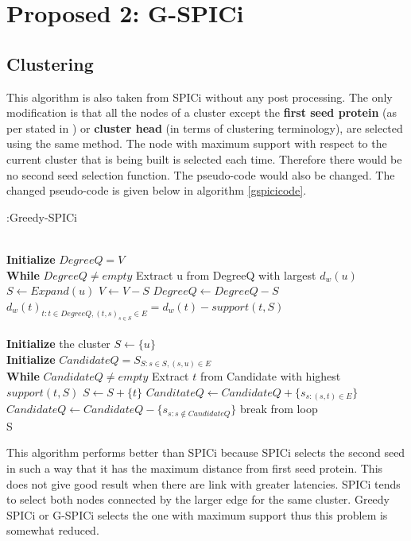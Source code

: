 \documentclass[10pt]{extarticle}
\begin{document}
	\section{Proposed 2: G-SPICi} \label{algo:gspici}
	
	\subsection{Clustering}
	This algorithm is  also taken from SPICi without any post processing. The only modification is that all the nodes of a cluster except the \textbf{first seed protein} (as per stated in \cite{spici}) or \textbf{cluster head} (in terms of clustering terminology), are selected using the same method. The node with maximum support with respect to the current cluster that is being built is selected each time. Therefore there would be no second seed selection function. The pseudo-code would also be changed. The changed pseudo-code is given below in algorithm \ref{gspicicode}.
	\begin{algorithm}
		\caption{:Greedy-SPICi}\label{gspicicode}
		\begin{algorithmic}[1]
			 \\
			\textbf{Initialize} $DegreeQ = V$ \\
			\textbf{While} $DegreeQ \neq empty$
			\State Extract u from DegreeQ with largest $d_w(u)$
			\State $S \gets Expand(u)$
			\State $V \gets V - S $
			\State $Degree Q \gets Degree Q - S$
			\State $d_w(t)_{t:t\in DegreeQ,(t,s)_{s\in S}\in E} = d_w(t) - support(t,S)$
			\EndProcedure\\
			\\
			\textbf{Initialize} the cluster $S \gets \{u\}$ \\
			\textbf{Initialize} $CandidateQ = S_{S:s\in S,(s,u)\in E}$\\
			\textbf{While} $CandidateQ \neq empty$
			\State Extract $t$ from Candidate with highest $support(t,S)$
			\State $S\gets S+\{t\}$
			\State $CanditateQ \gets CandidateQ + \{s_{s:(s,t)\in E}\}$
			\State $CandidateQ \gets CandidateQ - \{s_{s:s\not\in CandidateQ}\}$
			\Else
			\State break from loop
			\EndIf \\
			\Return S
			\EndProcedure
		\end{algorithmic}
	\end{algorithm}
	
	This algorithm performs better than SPICi because SPICi selects the second seed in such a way that it has the maximum distance from first seed protein. This does not give good result when there are link with greater latencies. SPICi tends to select both nodes connected by the larger edge for the same cluster. Greedy SPICi or G-SPICi selects the one with maximum support thus this problem is somewhat reduced.
	
\end{document}
